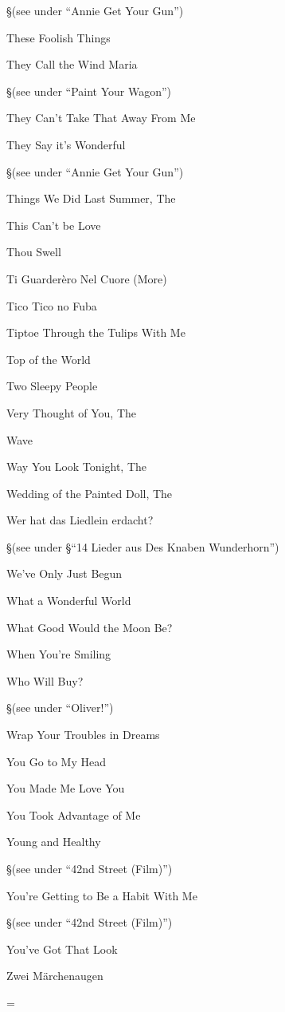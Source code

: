 \nobreak
\S (see under ``Annie Get Your Gun'')

\N These Foolish Things


\N They Call the Wind Maria

\nobreak
\S (see under ``Paint Your Wagon'')

\N They Can't Take That Away From Me


\N They Say it's Wonderful

\nobreak
\S (see under ``Annie Get Your Gun'')

\N Things We Did Last Summer, The


\N This Can't be Love


\N Thou Swell


\N Ti Guarder{\`e}ro Nel Cuore (More)


\N Tico Tico no Fuba


\N Tiptoe Through the Tulips With Me


\N Top of the World


\N Two Sleepy People


\N Very Thought of You, The


\N Wave


\N Way You Look Tonight, The


\N Wedding of the Painted Doll, The


\N Wer hat das Liedlein erdacht?

\nobreak
\S (see under
\S ``14 Lieder aus Des Knaben Wunderhorn'')

\N We've Only Just Begun


\N What a Wonderful World


\N What Good Would the Moon Be?


\N When You're Smiling


\N Who Will Buy?

\nobreak
\S (see under ``Oliver!'')

\N Wrap Your Troubles in Dreams


\N You Go to My Head


\N You Made Me Love You


\N You Took Advantage of Me


\N Young and Healthy

\nobreak
\S (see under ``42nd Street (Film)'')

\N You're Getting to Be a Habit With Me

\nobreak
\S (see under ``42nd Street (Film)'')

\N You've Got That Look


\N Zwei M{\"a}rchenaugen


\singlecolumn
\vfil\eject
\pagecnt=\pageno
\endinput

